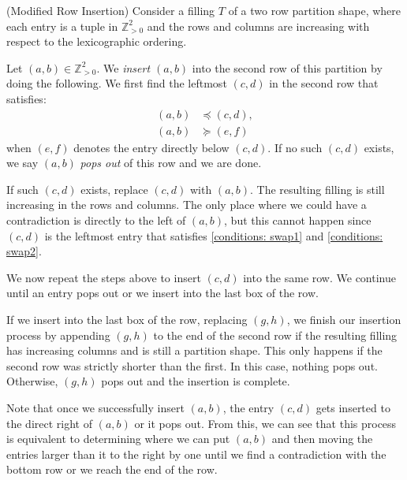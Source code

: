 \documentclass[ALCO, Unicode]{cedram}
\begin{document}
\begin{alg}\label{alg: insertion} (Modified Row Insertion)
Consider a filling $T$ of a two row partition shape, where each entry is a tuple in $\mathbb{Z}^2_{>0}$ and the rows and columns are increasing with respect to the lexicographic ordering. 

Let $(a,b) \in \mathbb{Z}^2_{>0}$. We \textit{insert $(a,b)$} into the second row of this partition by doing the following.
We first find the leftmost $(c,d)$ in the second row that satisfies:
\begin{align}
        (a,b) & \preceq (c,d) \label{conditions: swap1},\\ (a,b) & \succeq (e,f)\label{conditions: swap2}
\end{align}
when $(e,f)$ denotes the entry directly below $(c,d)$.
If no such $(c,d)$ exists, we say $(a,b)$ \textit{pops out} of this row and we are done. 

If such $(c,d)$ exists, replace $(c,d)$ with $(a,b)$. The resulting filling is still increasing in the rows and columns. 
The only place where we could have a contradiction is directly to the left of $(a,b)$, but this cannot happen since $(c,d)$ is the leftmost entry that satisfies \eqref{conditions: swap1} and \eqref{conditions: swap2}.

We now repeat the steps above to insert $(c,d)$ into the same row. We continue until an entry pops out or we insert into the last box of the row. 

If we insert into the last box of the row, replacing $(g,h)$, we finish our insertion process by appending $(g,h)$ to the end of the second row if the resulting filling has increasing columns and is still a partition shape. This only happens if the second row was strictly shorter than the first. In this case, nothing pops out.
Otherwise, $(g,h)$ pops out and the insertion is complete. 

Note that once we successfully insert $(a,b)$, the entry $(c,d)$ gets inserted to the direct right of $(a,b)$ or it pops out. 
From this, we can see that this process is equivalent to determining where we can put $(a,b)$ and then moving the entries larger than it to the right by one until we find a contradiction with the bottom row or we reach the end of the row. 
\end{alg}
\end{document}
